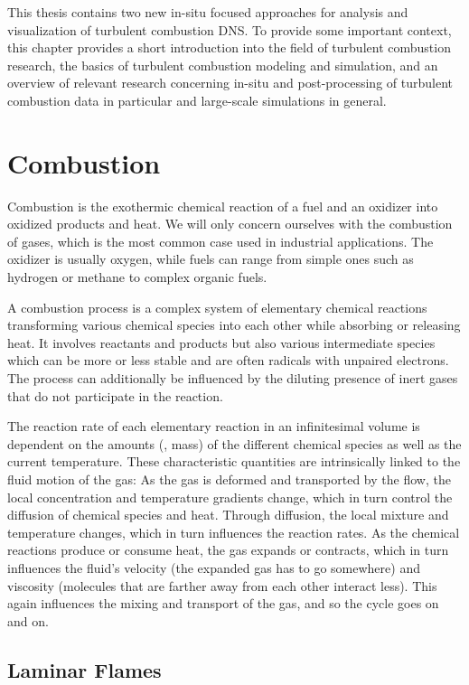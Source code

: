 %
This thesis contains two new in-situ focused approaches for analysis and
visualization of turbulent combustion \ac{DNS}.
%
To provide some important context, this chapter provides a short introduction
into the field of turbulent combustion research, the basics of turbulent
combustion modeling and simulation, and an overview of relevant research
concerning in-situ and post-processing of turbulent combustion data in
particular and large-scale simulations in general.
%

\section{Combustion} %
\label{sec:combustion}
%
Combustion is the exothermic chemical reaction of a fuel and an oxidizer into
oxidized products and heat.
%
We will only concern ourselves with the combustion of gases, which is the
most common case used in industrial applications.
%
The oxidizer is usually oxygen, while fuels can range from simple ones such as
hydrogen or methane to complex organic fuels.
%

%
A combustion process is a complex system of elementary chemical reactions
transforming various chemical species into each other while absorbing or
releasing heat.
%
It involves reactants and products but also various intermediate species which
can be more or less stable and are often radicals with unpaired electrons.
%
The process can additionally be influenced by the diluting presence of inert
gases that do not participate in the reaction.
%

%
The reaction rate of each elementary reaction in an infinitesimal volume is
dependent on the amounts (\ie, mass) of the different chemical species as well
as the current temperature.
%
These characteristic quantities are intrinsically linked to the fluid motion of
the gas:
%
As the gas is deformed and transported by the flow, the local concentration and
temperature gradients change, which in turn control the diffusion of chemical
species and heat.
%
Through diffusion, the local mixture and temperature changes, which in turn
influences the reaction rates.
%
As the chemical reactions produce or consume heat, the gas expands or contracts,
which in turn influences the fluid's velocity (the expanded gas has to go
somewhere) and viscosity (molecules that are farther away from each other
interact less).
%
This again influences the mixing and transport of the gas, and so the cycle goes
on and on.
%
\subsection{Laminar Flames} %
\label{sub:laminar_flames}
%

